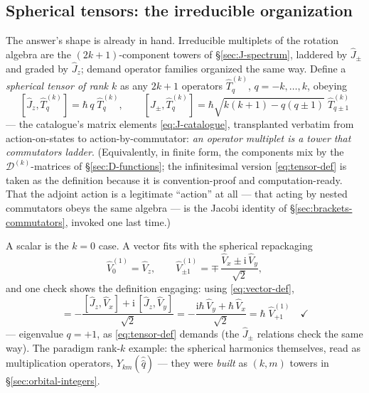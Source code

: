 \documentclass[11pt]{article}
\theoremstyle{plain}
\theoremstyle{definition}
\theoremstyle{remark}
\newcommand{\ii}{\mathrm{i}}
\newcommand{\op}[1]{\hat{#1}}
\begin{document}
\subsection{Spherical tensors: the irreducible organization}
\label{sec:spherical-tensors}

The answer's shape is already in hand. Irreducible multiplets of the
rotation algebra are the $(2k{+}1)$-component towers of
\S\ref{sec:J-spectrum}, laddered by $\op J_\pm$ and graded by
$\op J_z$; demand operator families organized the same way. Define
a \emph{spherical tensor of rank $k$} as any $2k{+}1$ operators
$\op T^{(k)}_q$, $q = -k, \dots, k$, obeying
\begin{equation}
  \boxed{\;
  [\op J_z, \op T^{(k)}_q] = \hbar\, q\;\op T^{(k)}_q,
  \qquad
  [\op J_\pm, \op T^{(k)}_q]
  = \hbar\sqrt{k(k+1) - q(q\pm1)}\;\op T^{(k)}_{q\pm1}
  \;}
  \label{eq:tensor-def}
\end{equation}
--- the catalogue's matrix elements \eqref{eq:J-catalogue},
transplanted verbatim from action-on-states to
action-by-commutator: \emph{an operator multiplet is a tower that
commutators ladder}. (Equivalently, in finite form, the components
mix by the $\mathscr D^{(k)}$-matrices of \S\ref{sec:D-functions};
the infinitesimal version \eqref{eq:tensor-def} is taken as the
definition because it is convention-proof and computation-ready.
That the adjoint action is a legitimate ``action'' at all --- that
acting by nested commutators obeys the same algebra --- is the
Jacobi identity of \S\ref{sec:brackets-commutators}, invoked one
last time.)

A scalar is the $k = 0$ case. A vector fits with the spherical
repackaging
\begin{equation}
  \op V^{(1)}_0 = \op V_z,
  \qquad
  \op V^{(1)}_{\pm1}
  = \mp\,\frac{\op V_x \pm \ii\,\op V_y}{\sqrt2},
  \label{eq:spherical-components}
\end{equation}
and one check shows the definition engaging: using
\eqref{eq:vector-def},
\begin{equation}
  [\op J_z,\ \op V^{(1)}_{+1}]
  = -\frac{[\op J_z, \op V_x] + \ii\,[\op J_z, \op V_y]}{\sqrt2}
  = -\frac{\ii\hbar\,\op V_y + \hbar\,\op V_x}{\sqrt2}
  = \hbar\;\op V^{(1)}_{+1}
  \quad\checkmark
\end{equation}
--- eigenvalue $q = +1$, as \eqref{eq:tensor-def} demands (the
$\op J_\pm$ relations check the same way). The paradigm rank-$k$
example: the spherical harmonics themselves, read as multiplication
operators, $Y_{km}(\hat{\op q})$ --- they were \emph{built} as
$(k, m)$ towers in \S\ref{sec:orbital-integers}.
\end{document}
